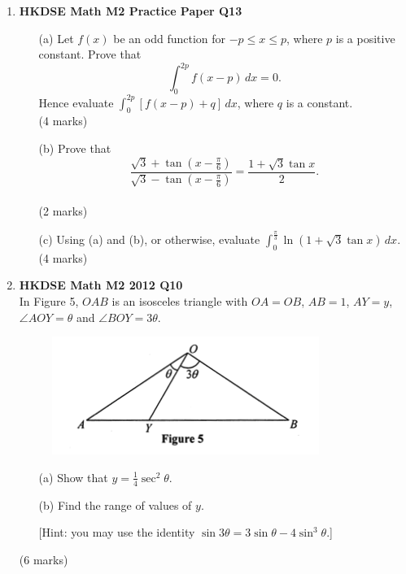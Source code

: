 \documentclass{report}
\begin{document}
\begin{enumerate}
	\newpage

	\item \textbf{HKDSE Math M2 Practice Paper Q13}
	\begin{enumerate}
		\item[(a)]Let $f(x)$ be an odd function for $-p \leq x \leq p$, where $p$ is a positive constant.
		Prove that $$\displaystyle\int_0^{2p} f(x-p)\,dx = 0.$$
		Hence evaluate $\displaystyle\int_0^{2p} [f(x-p)+q]\,dx $, where $q$ is a constant. \\(4 marks)
		\item[(b)]Prove that $$\displaystyle\frac{\sqrt{3} + \tan{\left(x - \displaystyle\frac{\pi}{6}\right)}}{\sqrt{3} - \tan{\left(x - \displaystyle\frac{\pi}{6}\right)}} = \frac{1+\sqrt{3}\tan{x}}{2}.$$ \\(2 marks)
		\item[(c)]Using (a) and (b), or otherwise, evaluate $\displaystyle\int_0^{\tfrac{\pi}{3}} \ln{(1 + \sqrt{3}\tan{x})} \,dx$. \\(4 marks)
	\end{enumerate}

	\item \textbf{HKDSE Math M2 2012 Q10}\\
	In Figure 5, $OAB$ is an isosceles triangle with $OA = OB$, $AB = 1$, $AY = y$, $\angle AOY = \theta$ and $\angle BOY = 3\theta$. 
	\begin{figure}[H]
		\centering
		\includegraphics[width = .5\linewidth]{2012Figure5}
	\end{figure}
	\begin{enumerate}
		\item [(a)]Show that $y = \displaystyle\frac{1}{4}\sec^2{\theta}$.
		\item [(b)]Find the range of values of $y$. 
		
		[Hint: you may use the identity $\sin{3\theta} = 3\sin{\theta} - 4\sin^3{\theta}$.]
	\end{enumerate}
	(6 marks)

	\newpage


\end{enumerate}
\end{document}
